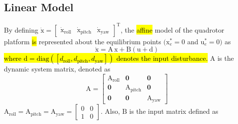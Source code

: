 \documentclass[3p]{elsarticle}
\begin{document}
\subsection{Linear Model}

\noindent By defining $\boldsymbol{\dot{\mathrm{x}}} = \begin{bmatrix}
    \boldsymbol{{\mathrm{\dot x_{\text{roll}}}}}&
    \boldsymbol{{\mathrm{\dot x_{\text{pitch}}}}}&
    \boldsymbol{{\mathrm{\dot x_{\text{yaw}}}}}
\end{bmatrix}^{\mathrm{T}}$, the \hl{affine} model of the quadrotor platform \hl{is} represented about the equilibrium points $(\boldsymbol{{\mathrm{x}}}_e^*\!=\!0$ and $\boldsymbol{{\mathrm{u}}}_e^*\!=\!0)$ as
\begin{equation}\label{eq:linear}
    \boldsymbol{\dot{\mathrm{x}}} = \boldsymbol{\mathrm{A\,x}} + 
    \boldsymbol{\mathrm{B}}
    \left(\boldsymbol{\mathrm{u}} + \boldsymbol{\mathrm{d}}\right)
\end{equation}
\hl{where $\boldsymbol{\mathrm{d}} = \text{diag}([d_{\text{roll}}, d_{\text{pitch}}, d_{\text{yaw}}])$ denotes the input disturbance.}
$\boldsymbol{\mathrm{A}}$ is the dynamic system matrix, denoted as
\begin{equation}
    \boldsymbol{\mathrm{A}} = \begin{bmatrix}
        \boldsymbol{{\mathrm{A_{\text{roll}}}}} & \boldsymbol{0} & \boldsymbol{0}\\
        \boldsymbol{0} & \boldsymbol{{\mathrm{A_{\text{pitch}}}}} & \boldsymbol{0} \\
        \boldsymbol{0} & \boldsymbol{0} & \boldsymbol{{\mathrm{A_{\text{yaw}}}}}
    \end{bmatrix}
\end{equation}
$
        \boldsymbol{\mathrm{A}}_{\text{roll}}  =\boldsymbol{\mathrm{A}}_{\text{pitch}}  = \boldsymbol{\mathrm{A}}_{\text{yaw}}  = \begin{bmatrix}
            0 & 0\\
            1 & 0
        \end{bmatrix}
$. Also, $\boldsymbol{\mathrm{B}}$ is the input matrix defined as
\end{document}
